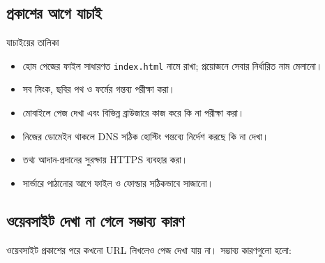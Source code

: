 \subsection{প্রকাশের আগে যাচাই}

\begin{keypointbox}{যাচাইয়ের তালিকা}
\par\noindent
\begin{minipage}[t]{.48\linewidth}\vspace{0pt}
\begin{itemize}
\item হোম পেজের ফাইল সাধারণত \texttt{index.html} নামে রাখা; প্রয়োজনে সেবার নির্ধারিত নাম মেলানো।
\item সব লিংক, ছবির পথ ও ফর্মের গন্তব্য পরীক্ষা করা।
\item মোবাইলে পেজ দেখা এবং বিভিন্ন ব্রাউজারে কাজ করে কি না পরীক্ষা করা।
\end{itemize}
\end{minipage}\hfill
\begin{minipage}[t]{.48\linewidth}\vspace{0pt}
\begin{itemize}
\item নিজের ডোমেইন থাকলে DNS সঠিক হোস্টিং গন্তব্যে নির্দেশ করছে কি না দেখা।
\item তথ্য আদান-প্রদানের সুরক্ষায় HTTPS ব্যবহার করা।
\item সার্ভারে পাঠানোর আগে ফাইল ও ফোল্ডার সঠিকভাবে সাজানো।
\end{itemize}
\end{minipage}\par

\end{keypointbox}





\subsection{ওয়েবসাইট দেখা না গেলে সম্ভাব্য কারণ}

ওয়েবসাইট প্রকাশের পরে কখনো URL লিখলেও পেজ দেখা যায় না। সম্ভাব্য কারণগুলো হলো:

